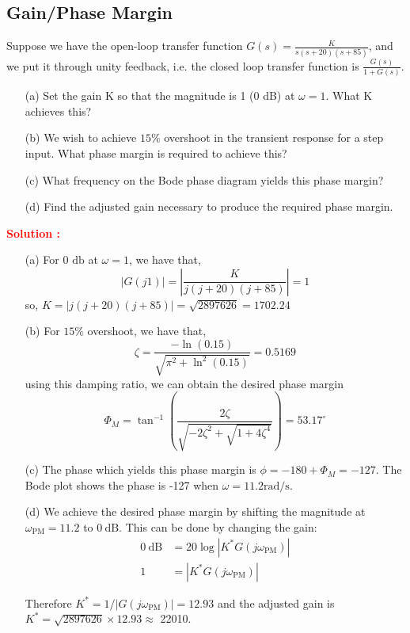 \documentclass[12pt]{article}
\begin{document}
\clearpage
\subsection{Gain/Phase Margin}

Suppose we have the open-loop transfer function $G(s) = \frac{K}{s(s + 20)(s + 85)}$, and we put it through unity feedback, i.e. the closed loop transfer function is $\frac{G(s)}{
1 + G(s)}$.
\begin{enumerate}
    \item [(a)] Set the gain K so that the magnitude is 1 (0 dB) at $\omega=1$. What K achieves
this?
\item[(b)] We wish to achieve $15\%$ overshoot in the transient response for a step input. What phase
margin is required to achieve this?
\item[(c)] What frequency on the Bode phase diagram yields this phase margin?
\item[(d)] Find the adjusted gain necessary to produce the required phase margin.
\end{enumerate}

\textbf{\textcolor{red}{Solution :}} \\
\begin{enumerate}
    \item  [(a)] For 0 $\mathrm{db}$ at $\omega=1$, we have that,
$$ |G(j 1)|=\left|\frac{K}{j(j+20)(j+85)}\right|=1 $$
so,  $K=|j(j+20)(j+85)|=\sqrt{2897626}=1702.24$
\item  [(b)] For $15 \%$ overshoot, we have that,
$$ \zeta=\frac{-\ln (0.15)}{\sqrt{\pi^2+\ln ^2(0.15)}}=0.5169 $$
using this damping ratio, we can obtain the desired phase margin
$$ \Phi_M=\tan ^{-1}\left(\frac{2 \zeta}{\sqrt{-2 \zeta^2+\sqrt{1+4 \zeta^4}}}\right)=53.17^{\circ} $$

\item  [(c)] The phase which yields this phase margin is $\phi=-180+\Phi_M=-127$. The Bode plot shows the phase is -127 when $\omega=11.2 \mathrm{rad} / \mathrm{s}$. 
\item  [(d)] We achieve the desired phase margin by shifting the magnitude at $\omega_{\mathrm{PM}}=11.2$ to $0 \mathrm{~dB}$. This can be done by changing the gain:
$$
\begin{aligned}
0 \mathrm{~dB} & =20 \log \left|K^* G\left(j \omega_{\mathrm{PM}}\right)\right| \\
1 & =\left|K^* G\left(j \omega_{\mathrm{PM}}\right)\right|
\end{aligned}
$$

Therefore $K^*=1 /\left|G\left(j \omega_{\mathrm{PM}}\right)\right|=12.93$ and the adjusted gain is $K^*=\sqrt{2897626} \times 12.93 \approx$ 22010.
\end{enumerate}
\clearpage
\end{document}
